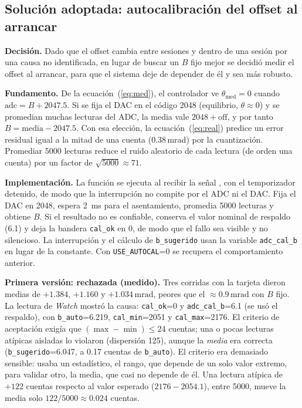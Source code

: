 \documentclass[12pt,letterpaper]{article}
\newcommand{\cod}[1]{\texttt{\detokenize{#1}}}
\newcommand{\mrad}{\,\mathrm{mrad}}
\begin{document}
\subsection{Solución adoptada: autocalibración del offset al arrancar}

\textbf{Decisión.} Dado que el offset cambia entre sesiones y dentro de una sesión por una causa no identificada, en lugar de buscar un $B$ fijo mejor se decidió medir el offset al arrancar, para que el sistema deje de depender de él y sea más robusto.

\textbf{Fundamento.} De la ecuación~(\ref{eq:med}), el controlador ve $\theta_{\mathrm{med}}=0$ cuando $\mathrm{adc}=B+2047.5$. Si se fija el DAC en el código 2048 (equilibrio, $\theta\approx 0$) y se promedian muchas lecturas del ADC, la media vale $2048+\mathrm{off}$, y por tanto $B=\mathrm{media}-2047.5$. Con esa elección, la ecuación~(\ref{eq:real}) predice un error residual igual a la mitad de una cuenta ($0.38\mrad$) por la cuantización. Promediar 5000 lecturas reduce el ruido aleatorio de cada lectura (de orden una cuenta) por un factor de $\sqrt{5000}\approx 71$.

\textbf{Implementación.} La función \cod{AutoCalibrar()} se ejecuta al recibir la señal \cod{S}, con el temporizador detenido, de modo que la interrupción no compite por el ADC ni el DAC. Fija el DAC en 2048, espera 2~ms para el asentamiento, promedia 5000 lecturas y obtiene $B$. Si el resultado no es confiable, conserva el valor nominal de respaldo (6.1) y deja la bandera \texttt{cal\_ok} en 0, de modo que el fallo sea visible y no silencioso. La interrupción y el cálculo de \texttt{b\_sugerido} usan la variable \texttt{adc\_cal\_b} en lugar de la constante. Con \texttt{USE\_AUTOCAL}=0 se recupera el comportamiento anterior.

\textbf{Primera versión: rechazada (medido).} Tres corridas con la tarjeta dieron medias de $+1.384$, $+1.160$ y $+1.034\mrad$, peores que el $\approx 0.9\mrad$ con $B$ fijo. La lectura de \textit{Watch} mostró la causa: \texttt{cal\_ok}=0 y \texttt{adc\_cal\_b}=6.1 (se usó el respaldo), con \texttt{b\_auto}=6.219, \texttt{cal\_min}=2051 y \texttt{cal\_max}=2176. El criterio de aceptación exigía que $(\max-\min)\le 24$ cuentas; una o pocas lecturas atípicas aisladas lo violaron (dispersión 125), aunque la \textit{media} era correcta (\texttt{b\_sugerido}=6.047, a 0.17 cuentas de \texttt{b\_auto}). El criterio era demasiado sensible: usaba un estadístico, el rango, que depende de un solo valor extremo, para validar otro, la media, que casi no depende de él. Una lectura atípica de $+122$ cuentas respecto al valor esperado ($2176-2054.1$), entre 5000, mueve la media solo $122/5000\approx 0.024$ cuentas.
\end{document}
